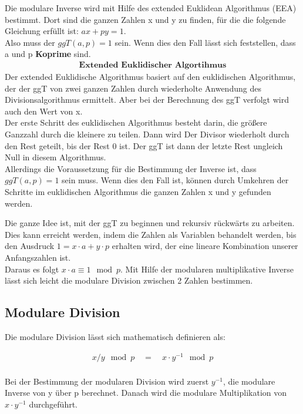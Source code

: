 Die modulare Inverse wird mit Hilfe des extended Euklidean Algorithmus (EEA) bestimmt.
Dort sind die ganzen Zahlen x und y zu finden, für die die folgende Gleichung erfüllt ist: $ ax + py = 1 $. \\
Also muss der $ ggT (a, p) = 1 $ sein. Wenn dies den Fall lässt sich feststellen, dass a und p \textbf{Koprime} sind.
\begin{align*}
    \textbf{Extended Euklidischer Algortihmus}
\end{align*}
Der extended Euklidische Algorithmus basiert auf den euklidischen Algorithmus, der der ggT von zwei ganzen Zahlen durch wiederholte Anwendung des Divisionsalgorithmus ermittelt. Aber bei der Berechnung des ggT verfolgt wird auch den Wert von x. \\

Der erste Schritt des euklidischen Algorithmus besteht darin, die größere Ganzzahl durch die kleinere zu teilen. Dann wird Der Divisor wiederholt durch den Rest geteilt, bis der Rest 0 ist. Der ggT ist dann der letzte Rest ungleich Null in diesem Algorithmus. \\
Allerdings die Voraussetzung für die Bestimmung der Inverse ist, dass $ ggT(a, p) = 1 $ sein muss. 
Wenn dies den Fall ist, können durch Umkehren der Schritte im euklidischen Algorithmus die ganzen Zahlen x und y gefunden werden.

Die ganze Idee ist, mit der ggT zu beginnen und rekursiv rückwärts zu arbeiten. Dies kann erreicht werden, indem die Zahlen als Variablen behandelt werden, bis den Ausdruck \(1 = x \cdot a + y \cdot p \) erhalten wird, der eine lineare Kombination unserer Anfangszahlen ist. \\
Daraus es folgt \( x \cdot a \equiv 1 \mod p \). 
Mit Hilfe der modularen multiplikative Inverse lässt sich leicht die modulare Division zwischen 2 Zahlen bestimmen.

\subsection{Modulare Division}

Die modulare Division lässt sich mathematisch definieren als:
\begin{ceqn}
\begin{align*}
    x/y \mod p \quad = \quad x \cdot y^{-1} \mod p \\
\end{align*}
\end{ceqn}

Bei der Bestimmung der modularen Division wird zuerst $ y^{-1}$, die modulare Inverse von y über p berechnet. Danach wird die modulare Multiplikation von $ x \cdot y^{-1} $ durchgeführt.  

